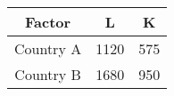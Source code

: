\begin{table}[ht]
    \centering
    \begin{tabular}{|c|c|c|}
    \hline
    Factor & L & K \\
    \hline
    Country A & 1120 & 575 \\
    \hline
    Country B & 1680 & 950 \\
    \hline
    \end{tabular}
\end{table}